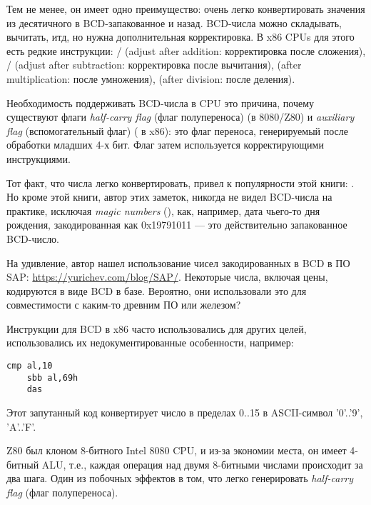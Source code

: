 Тем не менее, он имеет одно преимущество: очень легко конвертировать значения из десятичного в \ac{BCD}-запакованное и назад.
BCD-числа можно складывать, вычитать, итд, но нужна дополнительная корректировка.
В x86 CPUs для этого есть редкие инструкции:
/ (adjust after addition: корректировка после сложения),
/ (adjust after subtraction: корректировка после вычитания),
 (after multiplication: после умножения),
 (after division: после деления).

Необходимость поддерживать \ac{BCD}-числа в CPU это причина, почему существуют флаги \emph{half-carry flag} (флаг полупереноса)
(в 8080/Z80) и
\emph{auxiliary flag} (вспомогательный флаг) ( в x86):
это флаг переноса, генерируемый после обработки младших 4-х бит. Флаг затем используется корректирующими инструкциями.

Тот факт, что числа легко конвертировать, привел к популярности этой книги:
.
Но кроме этой книги, автор этих заметок, никогда не видел \ac{BCD}-числа на практике, исключая
\emph{magic numbers} (),
как, например, дата чьего-то дня рождения, закодированная как 0x19791011 --- это действительно запакованное
\ac{BCD}-число.

На удивление, автор нашел использование чисел закодированных в \ac{BCD} в ПО SAP: \url{https://yurichev.com/blog/SAP/}.
Некоторые числа, включая цены, кодируются в виде \ac{BCD} в базе.
Вероятно, они использовали это для совместимости с каким-то древним ПО или железом?

Инструкции для \ac{BCD} в x86 часто использовались для других целей, использовались их недокументированные особенности,
например:

\begin{lstlisting}[style=customasmx86]
	cmp al,10
	sbb al,69h
	das
\end{lstlisting}

Этот запутанный код конвертирует число в пределах 0..15 в \ac{ASCII}-символ '0'..'9', 'A'..'F'.


Z80 был клоном 8-битного Intel 8080 CPU, и из-за экономии места, он имеет 4-битный \ac{ALU}, т.е., каждая
операция над двумя 8-битными числами происходит за два шага.
Один из побочных эффектов в том, что легко генерировать \emph{half-carry flag} (флаг полупереноса).

